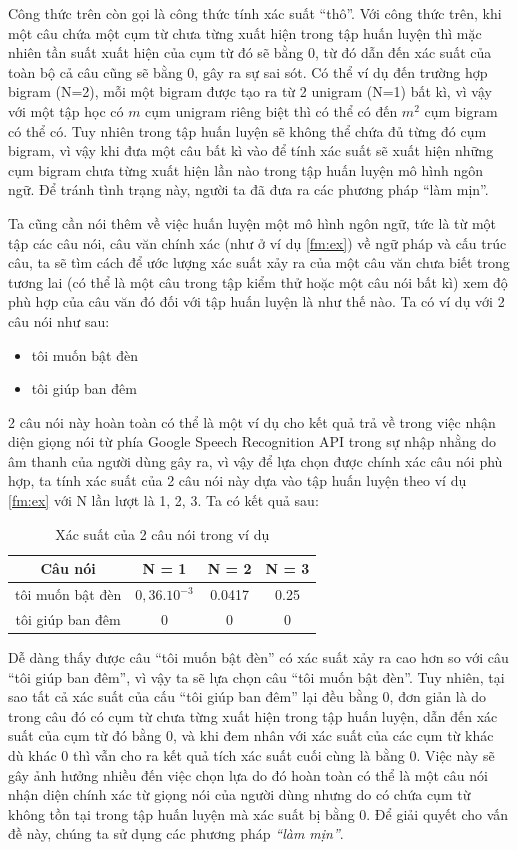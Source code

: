 \documentclass[12pt]{report}
\begin{document}
Công thức trên còn gọi là công thức tính xác suất ``thô''. Với công thức trên, khi một câu chứa một cụm từ chưa từng xuất hiện trong tập huấn luyện thì mặc nhiên tần suất xuất hiện của cụm từ đó sẽ bằng 0, từ đó dẫn đến xác suất của toàn bộ cả câu cũng sẽ bằng 0, gây ra sự sai sót. Có thể ví dụ đến trường hợp bigram (N=2), mỗi một bigram được tạo ra từ 2 unigram (N=1) bất kì, vì vậy với một tập học có $m$ cụm unigram riêng biệt thì có thể có đến $m^2$ cụm bigram có thể có. Tuy nhiên trong tập huấn luyện sẽ không thể chứa đủ từng đó cụm bigram, vì vậy khi đưa một câu bất kì vào để tính xác suất sẽ xuất hiện những cụm bigram chưa từng xuất hiện lần nào trong tập huấn luyện mô hình ngôn ngữ. Để tránh tình trạng này, người ta đã đưa ra các phương pháp ``làm mịn''.

Ta cũng cần nói thêm về việc huấn luyện một mô hình ngôn ngữ, tức là từ một tập các câu nói, câu văn chính xác (như ở ví dụ \ref{fm:ex}) về ngữ pháp và cấu trúc câu, ta sẽ tìm cách để ước lượng xác suất xảy ra của một câu văn chưa biết trong tương lai (có thể là một câu trong tập kiểm thử hoặc một câu nói bất kì) xem độ phù hợp của câu văn đó đối với tập huấn luyện là như thế nào. Ta có ví dụ với 2 câu nói như sau:

\begin{itemize}
 	\item tôi muốn bật đèn
 	\item tôi giúp ban đêm
 \end{itemize} 

2 câu nói này hoàn toàn có thể là một ví dụ cho kết quả trả về trong việc nhận diện giọng nói từ phía Google Speech Recognition API trong sự nhập nhằng do âm thanh của người dùng gây ra, vì vậy để lựa chọn được chính xác câu nói phù hợp, ta tính xác suất của 2 câu nói này dựa vào tập huấn luyện theo ví dụ \ref{fm:ex} với N lần lượt là 1, 2, 3. Ta có kết quả sau:

\begin{table}[h]
	\caption{Xác suất của 2 câu nói trong ví dụ}
	\centering
	\begin{tabular}{ | c | C | C | C | }
	\hline
	Câu nói & N = 1 & N = 2 & N = 3 \\
	\hline
	tôi muốn bật đèn & $0,36.10^{-3}$ & 0.0417 & 0.25  \\
	\hline
	tôi giúp ban đêm & 0 & 0 & 0  \\
	\hline
	\end{tabular}
\end{table}

Dễ dàng thấy được câu ``tôi muốn bật đèn'' có xác suất xảy ra cao hơn so với câu ``tôi giúp ban đêm'', vì vậy ta sẽ lựa chọn câu ``tôi muốn bật đèn''. Tuy nhiên, tại sao tất cả xác suất của cấu ``tôi giúp ban đêm'' lại đều bằng 0, đơn giản là do trong câu đó có cụm từ chưa từng xuất hiện trong tập huấn luyện, dẫn đến xác suất của cụm từ đó bằng 0, và khi đem nhân với xác suất của các cụm từ khác dù khác 0 thì vẫn cho ra kết quả tích xác suất cuối cùng là bằng 0. Việc này sẽ gây ảnh hưởng nhiều đến việc chọn lựa do đó hoàn toàn có thể là một câu nói nhận diện chính xác từ giọng nói của người dùng nhưng do có chứa cụm từ không tồn tại trong tập huấn luyện mà xác suất bị bằng 0. Để giải quyết cho vấn đề này, chúng ta sử dụng các phương pháp \textit{``làm mịn''}.
\end{document}
